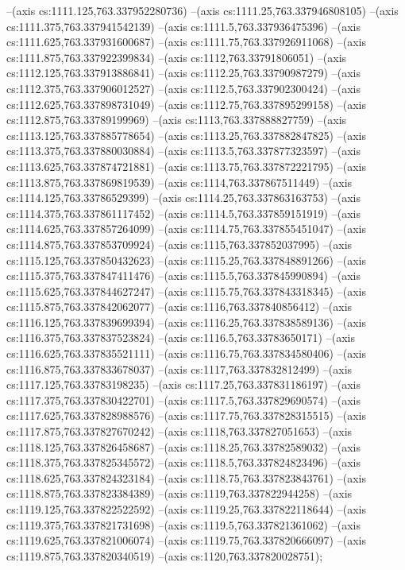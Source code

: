 --(axis cs:1111.125,763.337952280736)
--(axis cs:1111.25,763.337946808105)
--(axis cs:1111.375,763.337941542139)
--(axis cs:1111.5,763.337936475396)
--(axis cs:1111.625,763.337931600687)
--(axis cs:1111.75,763.337926911068)
--(axis cs:1111.875,763.337922399834)
--(axis cs:1112,763.33791806051)
--(axis cs:1112.125,763.337913886841)
--(axis cs:1112.25,763.33790987279)
--(axis cs:1112.375,763.337906012527)
--(axis cs:1112.5,763.337902300424)
--(axis cs:1112.625,763.337898731049)
--(axis cs:1112.75,763.337895299158)
--(axis cs:1112.875,763.33789199969)
--(axis cs:1113,763.337888827759)
--(axis cs:1113.125,763.337885778654)
--(axis cs:1113.25,763.337882847825)
--(axis cs:1113.375,763.337880030884)
--(axis cs:1113.5,763.337877323597)
--(axis cs:1113.625,763.337874721881)
--(axis cs:1113.75,763.337872221795)
--(axis cs:1113.875,763.337869819539)
--(axis cs:1114,763.337867511449)
--(axis cs:1114.125,763.33786529399)
--(axis cs:1114.25,763.337863163753)
--(axis cs:1114.375,763.337861117452)
--(axis cs:1114.5,763.337859151919)
--(axis cs:1114.625,763.337857264099)
--(axis cs:1114.75,763.337855451047)
--(axis cs:1114.875,763.337853709924)
--(axis cs:1115,763.337852037995)
--(axis cs:1115.125,763.337850432623)
--(axis cs:1115.25,763.337848891266)
--(axis cs:1115.375,763.337847411476)
--(axis cs:1115.5,763.337845990894)
--(axis cs:1115.625,763.337844627247)
--(axis cs:1115.75,763.337843318345)
--(axis cs:1115.875,763.337842062077)
--(axis cs:1116,763.337840856412)
--(axis cs:1116.125,763.337839699394)
--(axis cs:1116.25,763.337838589136)
--(axis cs:1116.375,763.337837523824)
--(axis cs:1116.5,763.33783650171)
--(axis cs:1116.625,763.337835521111)
--(axis cs:1116.75,763.337834580406)
--(axis cs:1116.875,763.337833678037)
--(axis cs:1117,763.337832812499)
--(axis cs:1117.125,763.33783198235)
--(axis cs:1117.25,763.337831186197)
--(axis cs:1117.375,763.337830422701)
--(axis cs:1117.5,763.337829690574)
--(axis cs:1117.625,763.337828988576)
--(axis cs:1117.75,763.337828315515)
--(axis cs:1117.875,763.337827670242)
--(axis cs:1118,763.337827051653)
--(axis cs:1118.125,763.337826458687)
--(axis cs:1118.25,763.33782589032)
--(axis cs:1118.375,763.337825345572)
--(axis cs:1118.5,763.337824823496)
--(axis cs:1118.625,763.337824323184)
--(axis cs:1118.75,763.337823843761)
--(axis cs:1118.875,763.337823384389)
--(axis cs:1119,763.337822944258)
--(axis cs:1119.125,763.337822522592)
--(axis cs:1119.25,763.337822118644)
--(axis cs:1119.375,763.337821731698)
--(axis cs:1119.5,763.337821361062)
--(axis cs:1119.625,763.337821006074)
--(axis cs:1119.75,763.337820666097)
--(axis cs:1119.875,763.337820340519)
--(axis cs:1120,763.337820028751);

